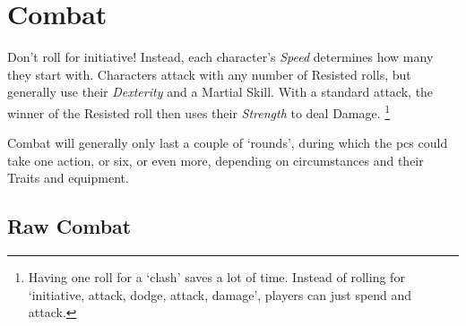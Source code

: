 \chapter[The Arena]{Combat}
\label{combat}

Don't roll for initiative!
Instead, each character's \textit{Speed} determines how many  they start with. 
Characters attack with any number of Resisted rolls, but generally use their \textit{Dexterity} and a Martial Skill.
With a standard attack, the winner of the Resisted roll then uses their \textit{Strength} to deal Damage.%
\footnote{Having one roll for a `clash' saves a lot of time.  Instead of rolling for `initiative, attack, dodge, attack, damage', players can just spend  and attack.}

Combat will generally only last a couple of `rounds', during which the \glspl{pc} could take one action, or six, or even more, depending on circumstances and their Traits and equipment.

\section{Raw Combat}

